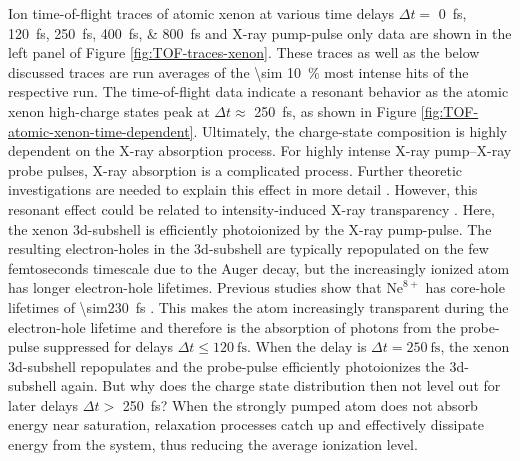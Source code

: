 Ion time-of-flight traces of atomic xenon at various time delays $\Delta t =$ \SIlist{0;120;250;400;800}{\femto\second} and X-ray pump-pulse only data are shown in the left panel of Figure \ref{fig:TOF-traces-xenon}. These traces as well as the below discussed traces are run averages of the \SI{\sim 10}{\percent} most intense hits of the respective run. The time-of-flight data indicate a resonant behavior as the atomic xenon high-charge states peak at $\Delta t\approx$ \SI{250}{\femto\second}, as shown in Figure \ref{fig:TOF-atomic-xenon-time-dependent}. Ultimately, the charge-state composition is highly dependent on the X-ray absorption process. For highly intense X-ray pump--X-ray probe pulses, X-ray absorption is a complicated process. Further theoretic investigations are needed to explain this effect in more detail \cite{Ho-2014-PRL,Ho-2016-PC}. However, this resonant effect could be related to intensity-induced X-ray transparency \citep{Young-2010-Nature,Schorb-2012-PRL}. Here, the xenon 3d-subshell is efficiently photoionized by the X-ray pump-pulse. The resulting electron-holes in the 3d-subshell are typically repopulated on the few femtoseconds timescale due to the Auger decay, but the increasingly ionized atom has longer electron-hole lifetimes. Previous studies show that $\text{Ne}^{8+}$ has core-hole lifetimes of \SI{\sim230}{\femto\second} \cite{Young-2010-Nature}. This makes the atom increasingly transparent during the electron-hole lifetime and therefore is the absorption of photons from the probe-pulse suppressed for delays $\Delta t \leq \SI{120}{\femto\second}$. When the delay is $\Delta t = \SI{250}{\femto\second}$, the xenon 3d-subshell repopulates and the probe-pulse efficiently photoionizes the 3d-subshell again. But why does the charge state distribution then not level out for later delays $\Delta t >$ \SI{250}{\femto\second}? When the strongly pumped atom does not absorb energy near saturation, relaxation processes catch up and effectively dissipate energy from the system, thus reducing the average ionization level.\\[1\baselineskip]
